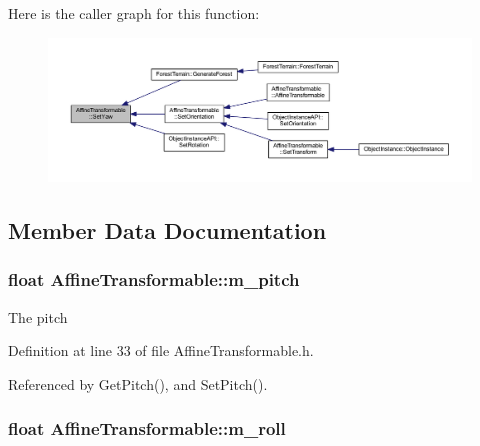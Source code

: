 Here is the caller graph for this function\+:
\nopagebreak
\begin{figure}[H]
\begin{center}
\leavevmode
\includegraphics[width=350pt]{class_affine_transformable_a47ab5b07df1ee77ae2e63dc0804c5caa_icgraph}
\end{center}
\end{figure}




\subsection{Member Data Documentation}
\subsubsection[{\texorpdfstring{m\+\_\+pitch}{m_pitch}}]{\setlength{\rightskip}{0pt plus 5cm}float Affine\+Transformable\+::m\+\_\+pitch\hspace{0.3cm}{\ttfamily [private]}}\hypertarget{class_affine_transformable_ade24cef424ce102502357cde8214d54b}{}\label{class_affine_transformable_ade24cef424ce102502357cde8214d54b}


The pitch 



Definition at line 33 of file Affine\+Transformable.\+h.



Referenced by Get\+Pitch(), and Set\+Pitch().

\subsubsection[{\texorpdfstring{m\+\_\+roll}{m_roll}}]{\setlength{\rightskip}{0pt plus 5cm}float Affine\+Transformable\+::m\+\_\+roll\hspace{0.3cm}{\ttfamily [private]}}\hypertarget{class_affine_transformable_a33e3fc9a32cafaa0a04c6058f283d437}{}\label{class_affine_transformable_a33e3fc9a32cafaa0a04c6058f283d437}


